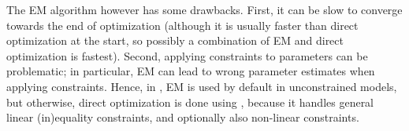 \documentclass[article]{jss}
\newcommand{\mat}{\mathbf}
\newcommand{\greekv}[1]{\mbox{\boldmath$\mathrm{#1}$}}
\begin{document}



The EM algorithm however has some drawbacks.  First, it can be slow to
converge towards the end of optimization (although it is usually
faster than direct optimization at the start, so possibly a
combination of EM and direct optimization is fastest).  Second,
applying constraints to parameters can be problematic; in particular,
EM can lead to wrong parameter estimates when applying constraints.
Hence, in , EM is used by default in unconstrained
models, but otherwise, direct optimization is done using 
\cite{Tamura2007,Spellucci2002}, because it handles general linear
(in)equality constraints, and optionally also non-linear constraints.

\end{document}
